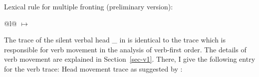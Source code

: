 \eas
\label{lr-mult-vf}
Lexical rule for multiple fronting (preliminary version):\\
\begin{tabular}[t]{@{}l@{}}
 $\mapsto$\\
\end{tabular}
\zs



\noindent
The trace of the silent verbal head \_ in  is identical to
the trace which is responsible for verb movement in the analysis of verb-first order. The details
of verb movement are explained in Section~\ref{sec-v1}. There, I give the following entry for the
verb trace:
\ea
\label{le-verbspur2-mf}
Head movement trace as suggested by :
\z

